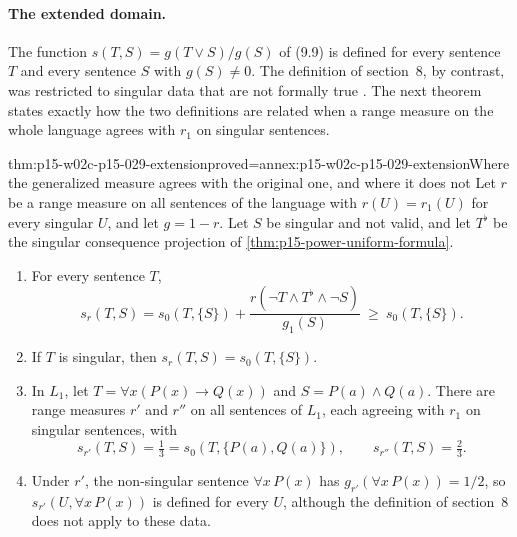 \paragraph{The extended domain.}
The function \(s(T,S)=g(T\vee S)/g(S)\) of (9.9) is defined for every
sentence \(T\) and every sentence \(S\) with \(g(S)\neq0\). The
definition of section~8, by contrast, was restricted to singular data
that are not formally true \cite[p.~172]{HempelOppenheim1948Explanation}.
The next theorem states exactly how the two definitions are related when
a range measure on the whole language agrees with \(r_1\) on singular
sentences.

\begin{hbtheorem}{thm:p15-w02c-p15-029-extension}{proved=annex:p15-w02c-p15-029-extension}{Where the generalized measure agrees with the original one, and where it does not}
Let \(r\) be a range measure on all sentences of the language with
\(r(U)=r_1(U)\) for every singular \(U\), and let \(g=1-r\). Let \(S\)
be singular and not valid, and let \(T^\flat\) be the singular
consequence projection of \cref{thm:p15-power-uniform-formula}.
\begin{enumerate}
\item For every sentence \(T\),
  \[
   s_r(T,S)=s_0(T,\{S\})+\frac{r(\neg T\land T^\flat\land\neg S)}{g_1(S)}
   \ \ge\ s_0(T,\{S\}).
  \]
\item If \(T\) is singular, then \(s_r(T,S)=s_0(T,\{S\})\).
\item In \(L_1\), let \(T=\forall x(P(x)\to Q(x))\) and
  \(S=P(a)\land Q(a)\). There are range measures \(r'\) and \(r''\) on
  all sentences of \(L_1\), each agreeing with \(r_1\) on singular
  sentences, with
  \[
   s_{r'}(T,S)=\tfrac13=s_0(T,\{P(a),Q(a)\}),\qquad
   s_{r''}(T,S)=\tfrac23 .
  \]
\item Under \(r'\), the non-singular sentence \(\forall x\,P(x)\) has
  \(g_{r'}(\forall x\,P(x))=1/2\), so \(s_{r'}(U,\forall x\,P(x))\) is
  defined for every \(U\), although the definition of section~8 does
  not apply to these data.
\end{enumerate}
\end{hbtheorem}

